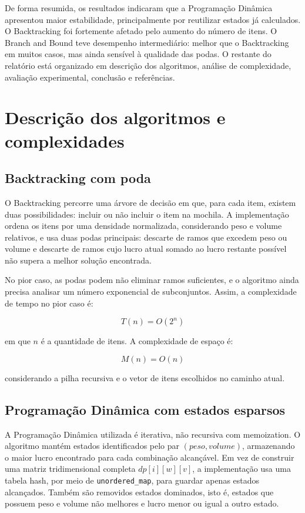 \documentclass[
    12pt,
    oneside,
    a4paper,
    brazil,
    article
]{abntex2}
\begin{document}
De forma resumida, os resultados indicaram que a Programação Dinâmica apresentou maior estabilidade, principalmente por reutilizar estados já calculados. O Backtracking foi fortemente afetado pelo aumento do número de itens. O Branch and Bound teve desempenho intermediário: melhor que o Backtracking em muitos casos, mas ainda sensível à qualidade das podas. O restante do relatório está organizado em descrição dos algoritmos, análise de complexidade, avaliação experimental, conclusão e referências.

\section{Descrição dos algoritmos e complexidades}

\subsection{Backtracking com poda}

O Backtracking percorre uma árvore de decisão em que, para cada item, existem duas possibilidades: incluir ou não incluir o item na mochila. A implementação ordena os itens por uma densidade normalizada, considerando peso e volume relativos, e usa duas podas principais: descarte de ramos que excedem peso ou volume e descarte de ramos cujo lucro atual somado ao lucro restante possível não supera a melhor solução encontrada.

No pior caso, as podas podem não eliminar ramos suficientes, e o algoritmo ainda precisa analisar um número exponencial de subconjuntos. Assim, a complexidade de tempo no pior caso é:

\[
T(n) = O(2^n)
\]

em que $n$ é a quantidade de itens. A complexidade de espaço é:

\[
M(n) = O(n)
\]

considerando a pilha recursiva e o vetor de itens escolhidos no caminho atual.

\subsection{Programação Dinâmica com estados esparsos}

A Programação Dinâmica utilizada é iterativa, não recursiva com memoization. O algoritmo mantém estados identificados pelo par $(peso, volume)$, armazenando o maior lucro encontrado para cada combinação alcançável. Em vez de construir uma matriz tridimensional completa $dp[i][w][v]$, a implementação usa uma tabela hash, por meio de \texttt{unordered\_map}, para guardar apenas estados alcançados. Também são removidos estados dominados, isto é, estados que possuem peso e volume não melhores e lucro menor ou igual a outro estado.
\end{document}
